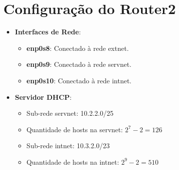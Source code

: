 \documentclass{article}
\begin{document}
\section{Configuração do Router2}
\begin{itemize}
    \item \textbf{Interfaces de Rede}:
    \begin{itemize}
        \item \textbf{enp0s8}: Conectado à rede extnet.
        \item \textbf{enp0s9}: Conectado à rede servnet.
        \item \textbf{enp0s10}: Conectado à rede intnet.
    \end{itemize}
    \item \textbf{Servidor DHCP}:
    \begin{itemize}
        \item Sub-rede servnet: 10.2.2.0/25
        \item Quantidade de hosts na servnet: \(2^7 - 2 = 126\)
        \item Sub-rede intnet: 10.3.2.0/23
        \item Quantidade de hosts na intnet: \(2^9 - 2 = 510\)
    \end{itemize}
\end{itemize}
\end{document}

